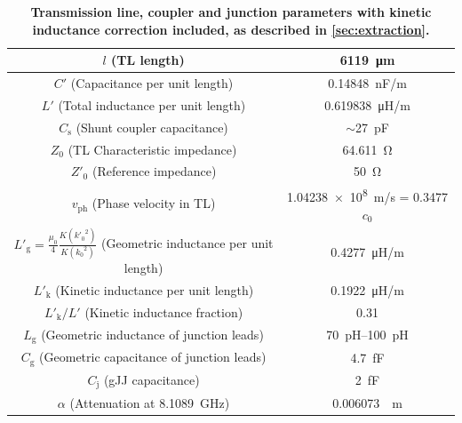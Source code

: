 \begin{table}
	\begin{center}
		\begin{tabular}{|c|c|}
			\hline 
			$l$ (TL length) & \SI{6119}{\micro\meter} \\ 
			\hline 
			$C'$ (Capacitance per unit length) & \SI{0.14848}{nF/m} \\ 
			\hline 
			$L'$ (Total inductance per unit length) & \SI{0.619838}{\micro\henry/m} \\ 
			\hline
			$C_\text{s}$ (Shunt coupler capacitance) & $\sim$\SI{27}{pF} \\ 
			\hline 
			$Z_0$ (TL Characteristic impedance) & \SI{64.611}{\ohm} \\
			\hline 
			$Z'_0$ (Reference impedance) & \SI{50}{\ohm} \\
			\hline 
			$v_\text{ph}$ (Phase velocity in TL) & \SI{1.04238e8}{m/s} = 0.3477 $c_0$ \\ 
			\hline
			$L'_\text{g} = \frac{\mu_0}{4}\frac{K({k'_0}^2)}{K({k_0}^2)}$ (Geometric inductance per unit length) & \SI{0.4277}{\micro\henry/m} \\ 
			\hline
			$L'_\text{k}$ (Kinetic inductance per unit length) & \SI{0.1922}{\micro\henry/m} \\ 
			\hline
			$L'_\text{k}/L'$ (Kinetic inductance fraction) & \num{0.31} \\ 
			\hline
			$L_\text{g}$ (Geometric inductance of junction leads) & \SIrange[range-phrase=--]{70}{100}{pH} \\ 
			\hline
			$C_\text{g}$ (Geometric capacitance of junction leads) & \SI{4.7}{fF} \\ 
			\hline
			$C_\text{j}$ (gJJ capacitance) & \SI{2}{fF} \\ 
			\hline
			$\alpha$ (Attenuation at \SI{8.1089}{GHz}) & \SI{0.006073}{\per\metre} \\ 
			\hline
		\end{tabular}
		\caption{\bf Transmission line, coupler and junction parameters with kinetic inductance correction included, as described in \ref{sec:extraction}.}
		\label{tab:tlpars}
	\end{center}
\end{table}





